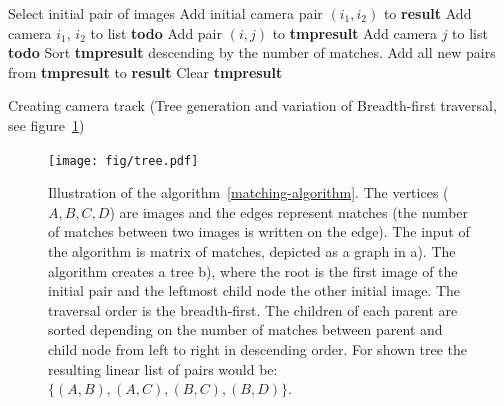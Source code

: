 \begin{itemize}
\begin{algorithm}[ht]
\begin{algorithmic}[1]
	\Statex
	\State Select initial pair of images 
	\State Add initial camera pair $(i_1, i_2)$ to \textbf{result}
	\State Add camera $i_1$, $i_2$ to list \textbf{todo}
				\State Add pair $(i, j)$ to \textbf{tmp\textunderscore result}
				\State Add camera $j$ to list \textbf{todo}
			\EndIf			
		\EndFor
		\State Sort \textbf{tmp\textunderscore result} descending by the number of matches.
		\State Add all new pairs from \textbf{tmp\textunderscore result} to \textbf{result}
		\State Clear \textbf{tmp\textunderscore result}
	\EndFor
\end{algorithmic}
\caption{Creating camera track (Tree generation and variation of Breadth-first traversal, see figure~\ref{fig:tree})}
\label{matching-algorithm}
\end{algorithm}

\begin{figure}[ht]
	\begin{center}
		\texttt{[image: fig/tree.pdf]}
	\end{center}
	\caption{Illustration of the algorithm~\ref{matching-algorithm}. The vertices ($A,B,C,D$) are images and the edges represent matches (the number of matches between two images is written on the edge). The input of the algorithm is matrix of matches, depicted as a graph in a). The algorithm creates a tree b), where the root is the first image of the initial pair and the leftmost child node the other initial image. The traversal order is the breadth-first. The children of each parent are sorted depending on the number of matches between parent and child node from left to right in descending order. For shown tree the resulting linear list of pairs would be: $\{(A,B),(A,C),(B,C),(B,D)\}$.}
	\label{fig:tree}
\end{figure}


\end{itemize}
